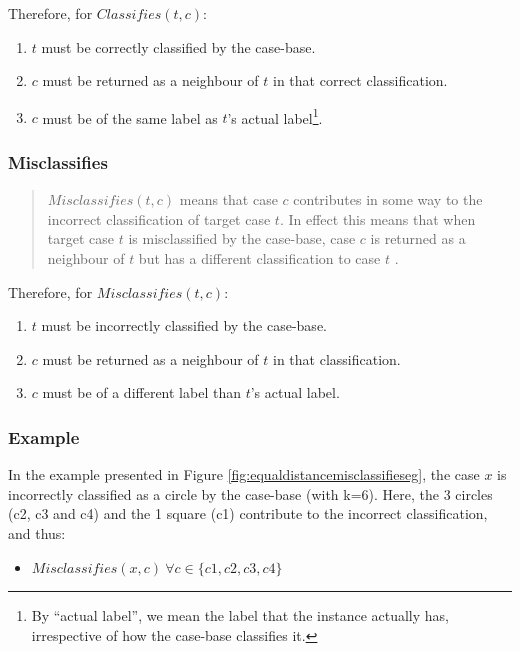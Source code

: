 \documentclass[a4paper,11pt]{report}
\begin{document}
Therefore, for $ Classifies(t, c) $:
\begin{enumerate}
	\item $t$ must be correctly classified by the case-base.
	\item $c$ must be returned as a neighbour of $t$ in that correct classification.
	\item $c$ must be of the same label as $t$'s actual label\footnote{By ``actual label'', we mean the label that the instance actually has, irrespective of how the case-base classifies it.}.
\end{enumerate}

\subsubsection{Misclassifies}

\begin{quote}
$ Misclassifies(t, c ) $ means that case $c$ contributes in some way to the incorrect classification of target case $t$. In effect this means that when target case $t$ is misclassified by the case-base, case $c$ is returned as a neighbour of $t$ but has a different classification to case $t$ \citep{Delany2009}.
\end{quote}


Therefore, for $ Misclassifies(t, c) $:
\begin{enumerate}
	\item $t$ must be incorrectly classified by the case-base.
	\item $c$ must be returned as a neighbour of $t$ in that classification.
	\item $c$ must be of a different label than $t$'s actual label.
\end{enumerate}

\subsubsection{Example}

In the example presented in Figure \ref{fig:equaldistancemisclassifieseg}, the case $x$ is incorrectly classified as a circle by the case-base (with k=6). Here, the 3 circles (c2, c3 and c4) and the 1 square (c1) contribute to the incorrect classification, and thus:
\begin{itemize}
	\item $Misclassifies(x,c)~\forall c\in\{c1,c2,c3,c4\}$
\end{itemize}
\end{document}
